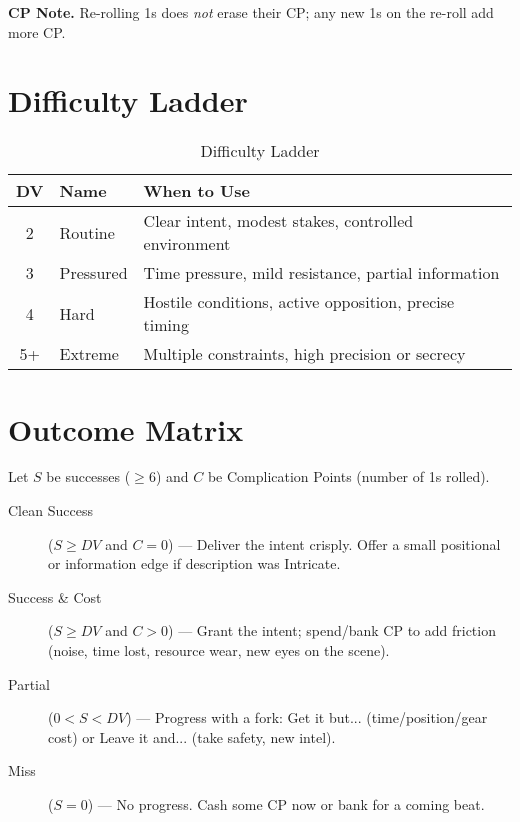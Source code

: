\noindent\textbf{CP Note.} Re-rolling 1s does \emph{not} erase their CP; any new 1s on the re-roll add more CP.

\section{Difficulty Ladder}

\begin{table}[htbp]
\centering
\begin{tabular}{cll}
\toprule
\textbf{DV} & \textbf{Name} & \textbf{When to Use} \\
\midrule
2 & Routine & Clear intent, modest stakes, controlled environment \\
3 & Pressured & Time pressure, mild resistance, partial information \\
4 & Hard & Hostile conditions, active opposition, precise timing \\
5+ & Extreme & Multiple constraints, high precision or secrecy \\
\bottomrule
\end{tabular}
\caption{Difficulty Ladder}
\end{table}

\section{Outcome Matrix}

Let $S$ be successes ($\geq 6$) and $C$ be Complication Points (number of 1s rolled).

\begin{description}
\item[Clean Success] ($S \geq DV$ and $C = 0$) --- Deliver the intent crisply. Offer a small positional or information edge if description was Intricate.
\item[Success \& Cost] ($S \geq DV$ and $C > 0$) --- Grant the intent; spend/bank CP to add friction (noise, time lost, resource wear, new eyes on the scene).
\item[Partial] ($0 < S < DV$) --- Progress with a fork: Get it but... (time/position/gear cost) or Leave it and... (take safety, new intel).
\item[Miss] ($S = 0$) --- No progress. Cash some CP now or bank for a coming beat.
\end{description}

